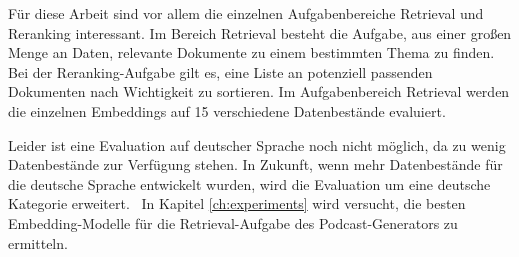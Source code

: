 Für diese Arbeit sind vor allem die einzelnen Aufgabenbereiche Retrieval und Reranking interessant. Im Bereich Retrieval besteht die Aufgabe, aus einer großen Menge an Daten, relevante Dokumente zu einem bestimmten Thema zu finden.
Bei der Reranking-Aufgabe gilt es, eine Liste an potenziell passenden Dokumenten nach Wichtigkeit zu sortieren.
Im Aufgabenbereich Retrieval werden die einzelnen Embeddings auf 15 verschiedene Datenbestände evaluiert.~\cite{muennighoff2023}

Leider ist eine Evaluation auf deutscher Sprache noch nicht möglich, da zu wenig Datenbestände zur Verfügung stehen.
In Zukunft, wenn mehr Datenbestände für die deutsche Sprache entwickelt wurden, wird die Evaluation um eine deutsche Kategorie erweitert.~\cite{muennighoff2023a}
In Kapitel \autoref{ch:experiments} wird versucht, die besten Embedding-Modelle für die Retrieval-Aufgabe des Podcast-Generators zu ermitteln.


